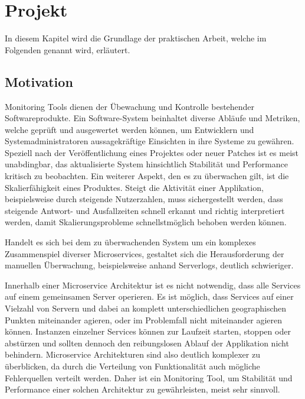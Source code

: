 
\chapter{Projekt \projectname{}}

In diesem Kapitel wird die Grundlage der praktischen Arbeit, welche im Folgenden \projectname{} genannt wird, erläutert.

\section{Motivation}
\label{sec:motivation}

Monitoring Tools dienen der Übewachung und Kontrolle bestehender Softwareprodukte.
Ein Software-System beinhaltet diverse Abläufe und Metriken, welche geprüft und ausgewertet werden können, um Entwicklern und Systemadministratoren
aussagekräftige Einsichten in ihre Systeme zu gewähren. Speziell nach der Veröffentlichung eines Projektes oder neuer Patches
ist es meist unabdingbar, das aktualisierte System hinsichtlich Stabilität und Performance kritisch zu beobachten. Ein weiterer Aspekt, den es zu überwachen gilt,
ist die Skalierfähigkeit eines Produktes. Steigt die Aktivität einer Applikation, beispielsweise durch steigende Nutzerzahlen,
muss sichergestellt werden, dass steigende Antwort- und Ausfallzeiten schnell erkannt und richtig interpretiert werden, damit Skalierungsprobleme schnellstmöglich behoben werden können.

Handelt es sich bei dem zu überwachenden System um ein komplexes Zusammenspiel diverser Microservices, gestaltet sich die Herausforderung der manuellen Überwachung, beispielsweise anhand
Serverlogs, deutlich schwieriger.

Innerhalb einer Microservice Architektur ist es nicht notwendig, dass alle Services auf einem gemeinsamen Server operieren.
Es ist möglich, dass Services auf einer Vielzahl von Servern und dabei an komplett unterschiedlichen geographischen Punkten miteinander agieren,
oder im Problemfall nicht miteinander agieren können. Instanzen einzelner Services können zur Laufzeit starten, stoppen oder abstürzen
und sollten dennoch den reibungslosen Ablauf der Applikation nicht behindern. Microservice Architekturen sind also deutlich komplexer zu überblicken, da durch die Verteilung von Funktionalität auch
mögliche Fehlerquellen verteilt werden.
Daher ist ein Monitoring Tool, um Stabilität und Performance einer solchen Architektur zu gewährleisten, meist sehr sinnvoll.

